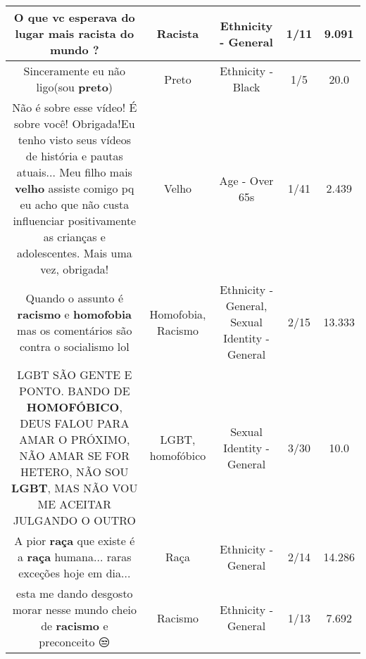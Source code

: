 \documentclass[11pt]{article}
\newlength\mylength
\begin{document}
\begin{center}
\begin{longtable}{|C{.65\mylength}|C{.30\mylength}|C{.12\mylength}|C{.12\mylength}|C{.12\mylength}|}
  \small O que vc esperava do lugar mais \textbf{racista} do mundo ?\normalsize   & Racista & Ethnicity - General & 1/11 & 9.091 \\  \hline
  \small Sinceramente eu não ligo(sou \textbf{preto})\normalsize   & Preto & Ethnicity - Black & 1/5 & 20.0 \\  \hline
  \small Não é sobre esse vídeo! É sobre você! Obrigada!Eu tenho visto seus vídeos de história e pautas atuais... Meu filho mais \textbf{velho} assiste comigo pq eu acho que não custa influenciar positivamente as crianças e adolescentes. Mais uma vez, obrigada!\normalsize   & Velho & Age - Over 65s & 1/41 & 2.439 \\  \hline
  \small Quando o assunto é \textbf{racismo} e \textbf{homofobia} mas os comentários são contra o socialismo lol\normalsize   & Homofobia, Racismo & Ethnicity - General, Sexual Identity - General & 2/15 & 13.333 \\  \hline
  \small LGBT SÃO GENTE E PONTO. BANDO DE \textbf{HOMOFÓBICO}, DEUS FALOU PARA AMAR O PRÓXIMO, NÃO AMAR SE FOR HETERO, NÃO SOU \textbf{LGBT}, MAS NÃO VOU ME ACEITAR JULGANDO O OUTRO\normalsize   & LGBT, homofóbico & Sexual Identity - General & 3/30 & 10.0 \\  \hline
  \small A pior \textbf{raça} que existe é a \textbf{raça} humana... raras exceções hoje em dia...\normalsize   & Raça & Ethnicity - General & 2/14 & 14.286 \\  \hline
  \small esta me dando desgosto morar nesse mundo cheio de \textbf{racismo} e preconceito 😒\normalsize   & Racismo & Ethnicity - General & 1/13 & 7.692 \\  \hline

\end{longtable}
\end{center}
\end{document}
